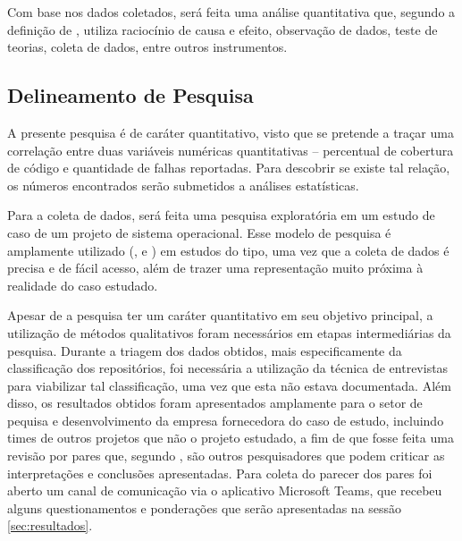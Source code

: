 \documentclass[11.5pt]{article}
\begin{document}
Com base nos dados coletados, será feita uma análise quantitativa que, segundo
a definição de \cite{projetoDePesquisa}, utiliza raciocínio de causa e efeito, observação de dados,
teste de teorias, coleta de dados, entre outros instrumentos.


\subsection{Delineamento de Pesquisa}

A presente pesquisa é de caráter quantitativo, visto que se pretende a traçar uma correlação entre
duas variáveis numéricas quantitativas -- percentual de cobertura de código e quantidade de falhas
reportadas.
Para descobrir se existe tal relação, os números encontrados serão submetidos a análises
estatísticas.

Para a coleta de dados, será feita uma pesquisa exploratória em um estudo de caso de um projeto
de sistema operacional.
Esse modelo de pesquisa é amplamente utilizado (\cite{coverageMetaAnalysis}, \cite{unitTestedCrash}
e \cite{coverageLargeScaleStudy}) em estudos do tipo, uma vez que a coleta de dados é precisa e de
fácil acesso, além de trazer uma representação muito próxima à realidade do caso estudado.

Apesar de a pesquisa ter um caráter quantitativo em seu objetivo principal, a utilização de métodos
qualitativos foram necessários em etapas intermediárias da pesquisa.
Durante a triagem dos dados obtidos, mais especificamente da classificação dos repositórios, foi
necessária a utilização da técnica de entrevistas para viabilizar tal classificação, uma vez que
esta não estava documentada.
Além disso, os resultados obtidos foram apresentados amplamente para o setor de pequisa e
desenvolvimento da empresa fornecedora do caso de estudo, incluindo times de outros projetos que não
o projeto estudado, a fim de que fosse feita uma revisão por pares que, segundo
\cite{metodosPesquisa}, são outros pesquisadores que podem criticar as interpretações e conclusões
apresentadas.
Para coleta do parecer dos pares foi aberto um canal de comunicação via o aplicativo Microsoft
Teams, que recebeu alguns questionamentos e ponderações que serão apresentadas na sessão
\ref{sec:resultados}.

\end{document}
